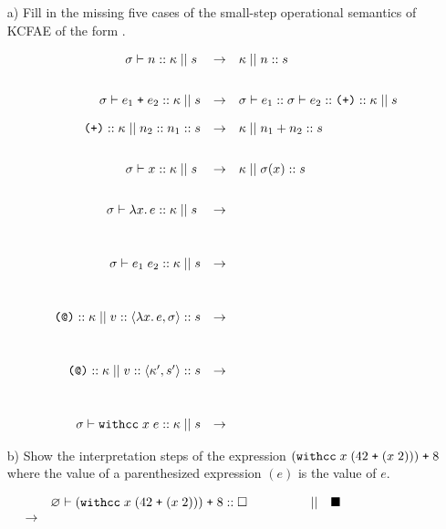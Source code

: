 \begin{enumerate}
\begin{itemize}
  \item[a)] Fill in the missing five cases of the small-step operational semantics of KCFAE
of the form .

{
\[
\begin{array}{rcl}
\sigma \vdash n :: \kappa \; || \; s \; &\rightarrow& \kappa \; || \; n :: s\\[2em]
\sigma \vdash e_1 \; \mbox{\texttt{+}}\; e_2 :: \kappa \; || \; s &\rightarrow& \sigma \vdash e_1 :: \sigma \vdash e_2 :: \mbox{\texttt{(+)}} :: \kappa \; || \; s\\[1em]
\mbox{\texttt{(+)}} :: \kappa \; || \; n_2 :: n_1 :: s &\rightarrow& \kappa \; || \; n_1 + n_2 :: s\\[2em]
\sigma \vdash x :: \kappa \; || \; s \; &\rightarrow& \kappa \; || \; \sigma(x) :: s\\[2em]
\sigma \vdash \lambda x.\, e :: \kappa \; || \; s \;
&\rightarrow& \\[3em]
\sigma \vdash e_1 \; e_2 :: \kappa \; || \; s &\rightarrow&\\[3em]
\mbox{\texttt{(@)}} :: \kappa \; || \; v :: \langle \lambda x.\,e, \sigma \rangle :: s &\rightarrow&\\[3em]
\mbox{\texttt{(@)}} :: \kappa \; || \; v :: \langle \kappa', s'\rangle :: s
& \rightarrow & \\[3em]
\sigma \vdash \mbox{\texttt{withcc}} \; x \; e :: \kappa \; || \; s
& \rightarrow &
\end{array}
\]
}

  \item[b)] Show the interpretation steps of the expression
\( (\mbox{\texttt{withcc}} \; x \; (42 \; \mbox{\texttt{+}} \; (x \; 2))) \; \mbox{\texttt{+}} \; 8 \)
where the value of a parenthesized expression $(e)$ is the value of $e$.
\end{itemize}

{
\[
\hspace*{-5em}
\begin{array}{rlcl}
  & \varnothing \vdash (\mbox{\texttt{withcc}} \; x \; (42 \; \mtt{+} \; (x \; 2))) \; \mtt{+} \; 8 :: \square
\qquad\qquad
 & || & \blacksquare\\
  \rightarrow
  & \\
\end{array}
\]
}


\end{enumerate}
